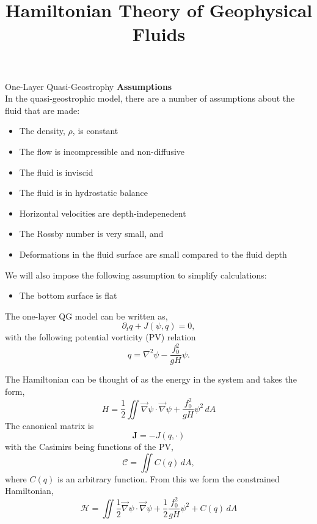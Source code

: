 \documentclass[12pt]{article}
\begin{document}
\title{Hamiltonian Theory of Geophysical Fluids}

\begin{section}{One-Layer Quasi-Geostrophy}
    \textbf{Assumptions} \\
    In the quasi-geostrophic model, there are a number of assumptions about the fluid that are made:
    \begin{itemize}
        \item The density, $\rho$, is constant
        \item The flow is incompressible and non-diffusive
        \item The fluid is inviscid
        \item The fluid is in hydrostatic balance
        \item Horizontal velocities are depth-indepenedent
        \item The Rossby number is very small, and
        \item Deformations in the fluid surface are small compared to the fluid depth
    \end{itemize}
    We will also impose the following assumption to simplify calculations:
    \begin{itemize}
        \item The bottom surface is flat
    \end{itemize}

    The one-layer QG model can be written as,
    $$
    \partial_t q + J(\psi, q) = 0,
    $$
    with the following potential vorticity (PV) relation
    $$
    q = \nabla^2 \psi - \frac{f_0^2}{gH} \psi.
    $$

    The Hamiltonian can be thought of as the energy in the system and takes the form,
    $$
    H =  \frac12 \iint \vec\nabla\psi \cdot \vec\nabla\psi + \frac{f_0^2}{g H} \psi^2 \, dA
    $$
    The canonical matrix is
    $$
    \mathbf{J} = -J(q,\cdot)
    $$
    with the Casimirs being functions of the PV,
    $$
    \mathcal{C} = \iint C(q) \, dA,
    $$
    where $C(q)$ is an arbitrary function. From this we form the constrained Hamiltonian,
    \begin{equation}
        \mathcal{H} = \iint  \frac12 \vec\nabla\psi \cdot \vec\nabla\psi + \frac12 \frac{f_0^2}{g H} \psi^2 + C(q) \, dA
        \label{eqn:qg_ol_h}
    \end{equation}


\end{section}
\end{document}
